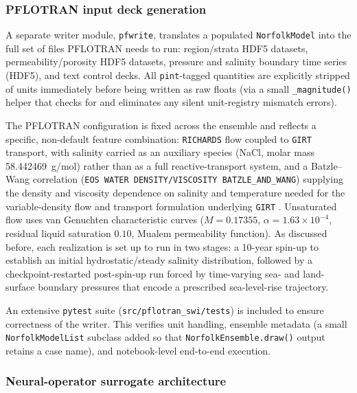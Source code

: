 \subsubsection{PFLOTRAN input deck generation}

A separate writer module, \texttt{pfwrite}, translates a populated
\texttt{NorfolkModel} into the full set of files PFLOTRAN needs to run:
region/strata HDF5 datasets, permeability/porosity HDF5 datasets, pressure
and salinity boundary time series (HDF5), and text control decks. All
\texttt{pint}-tagged quantities are explicitly stripped of units immediately
before being written as raw floats (via a small \texttt{\_magnitude()}
helper that checks for and eliminates any silent unit-registry mismatch
errors).

The PFLOTRAN \citep{hammond2012pflotran} configuration is fixed across
the ensemble and reflects a specific, non-default feature combination:
\texttt{RICHARDS} flow coupled to \texttt{GIRT} transport, with salinity
carried as an auxiliary species (NaCl, molar mass 58.442469~g/mol) rather
than as a full reactive-transport system, and a Batzle--Wang correlation
(\texttt{EOS WATER DENSITY/VISCOSITY BATZLE\_AND\_WANG}) supplying the
density and viscosity dependence on salinity and temperature needed for the
variable-density flow and transport formulation underlying
\texttt{GIRT} \citep{lichtner2014multiscale}. Unsaturated flow
uses van Genuchten characteristic curves
($M = 0.17355$, $\alpha = 1.63\times10^{-4}$, residual liquid saturation
$0.10$, Mualem permeability function). As discussed before, each realization is set up to run in two stages: a 10-year spin-up to establish an initial hydrostatic/steady salinity distribution, followed by a checkpoint-restarted post-spin-up run forced by time-varying sea- and land-surface boundary pressures that encode a prescribed sea-level-rise trajectory. 

An extensive \texttt{pytest} suite (\texttt{src/pflotran\_swi/tests}) is included to ensure correctness of the writer. This verifies unit handling, ensemble metadata (a small \texttt{NorfolkModelList} subclass added so that
\texttt{NorfolkEnsemble.draw()} output retains a case name), and
notebook-level end-to-end execution.

\subsubsection{Neural-operator surrogate architecture}

